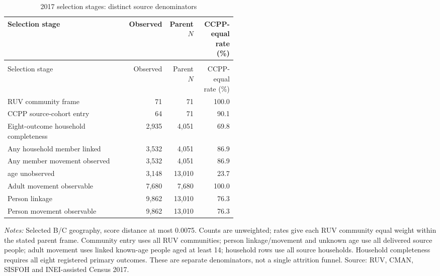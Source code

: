 \begingroup\fontsize{9.25}{11.4}\selectfont
\setlength{\tabcolsep}{3pt}\renewcommand{\arraystretch}{1.18}
\begin{longtable}{@{}>{\raggedright\arraybackslash}p{0.53\linewidth}rrr@{}}
\caption{2017 selection stages: distinct source denominators}\label{tab:pub_A23} \\
\toprule Selection stage & Observed & Parent \(N\) & CCPP-equal rate (\%) \\ \midrule\endfirsthead
\multicolumn{4}{c}{\tablename\ \thetable{} -- continued} \\
\toprule Selection stage & Observed & Parent \(N\) & CCPP-equal rate (\%) \\ \midrule\endhead
RUV community frame & 71 & 71 & 100.0 \\
CCPP source-cohort entry & 64 & 71 & 90.1 \\
Eight-outcome household completeness & 2,935 & 4,051 & 69.8 \\
Any household member linked & 3,532 & 4,051 & 86.9 \\
Any member movement observed & 3,532 & 4,051 & 86.9 \\
2017 age unobserved & 3,148 & 13,010 & 23.7 \\
Adult movement observable & 7,680 & 7,680 & 100.0 \\
Person linkage & 9,862 & 13,010 & 76.3 \\
Person movement observable & 9,862 & 13,010 & 76.3 \\
\bottomrule\end{longtable}
\parbox{0.98\linewidth}{\footnotesize\textit{Notes:} Selected B/C geography, score distance at most 0.0075. Counts are unweighted; rates give each RUV community equal weight within the stated parent frame. Community entry uses all RUV communities; person linkage/movement and unknown age use all delivered source people; adult movement uses linked known-age people aged at least 14; household rows use all source households. Household completeness requires all eight registered primary outcomes. These are separate denominators, not a single attrition funnel. Source: RUV, CMAN, SISFOH and INEI-assisted Census 2017.}
\par{}\par\endgroup
